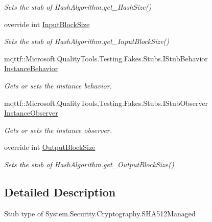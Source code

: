 \begin{DoxyCompactItemize}
\begin{DoxyCompactList}\small\item\em Sets the stub of Hash\-Algorithm.\-get\-\_\-\-Hash\-Size()\end{DoxyCompactList}\item 
override int \hyperlink{class_system_1_1_security_1_1_cryptography_1_1_fakes_1_1_stub_s_h_a512_managed_a0dc07e85ec0f593736f18491e6cd2811}{Input\-Block\-Size}
\begin{DoxyCompactList}\small\item\em Sets the stub of Hash\-Algorithm.\-get\-\_\-\-Input\-Block\-Size()\end{DoxyCompactList}\item 
mqttf\-::\-Microsoft.\-Quality\-Tools.\-Testing.\-Fakes.\-Stubs.\-I\-Stub\-Behavior \hyperlink{class_system_1_1_security_1_1_cryptography_1_1_fakes_1_1_stub_s_h_a512_managed_a16a11a71967830254b1bd1fce70a4b32}{Instance\-Behavior}
\begin{DoxyCompactList}\small\item\em Gets or sets the instance behavior.\end{DoxyCompactList}\item 
mqttf\-::\-Microsoft.\-Quality\-Tools.\-Testing.\-Fakes.\-Stubs.\-I\-Stub\-Observer \hyperlink{class_system_1_1_security_1_1_cryptography_1_1_fakes_1_1_stub_s_h_a512_managed_ab2eb3324a9ae6749394c1e04af4f7126}{Instance\-Observer}
\begin{DoxyCompactList}\small\item\em Gets or sets the instance observer.\end{DoxyCompactList}\item 
override int \hyperlink{class_system_1_1_security_1_1_cryptography_1_1_fakes_1_1_stub_s_h_a512_managed_a7bb3660bef84214ccafa438dda37fa30}{Output\-Block\-Size}
\begin{DoxyCompactList}\small\item\em Sets the stub of Hash\-Algorithm.\-get\-\_\-\-Output\-Block\-Size()\end{DoxyCompactList}\end{DoxyCompactItemize}


\subsection{Detailed Description}
Stub type of System.\-Security.\-Cryptography.\-S\-H\-A512\-Managed



